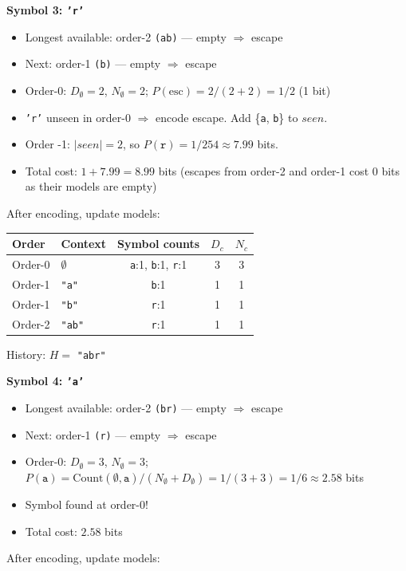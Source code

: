 \begin{examplebox}
\bigskip
\textbf{Symbol 3: \texttt{'r'}}
\begin{itemize}
    \item Longest available: order-2 \texttt{(ab)} — empty $\Rightarrow$ escape
    \item Next: order-1 \texttt{(b)} — empty $\Rightarrow$ escape
    \item Order-0: $D_{\emptyset}=2$, $N_{\emptyset}=2$; $P(\text{esc}) = 2/(2+2) = 1/2$ (1 bit)
    \item \texttt{'r'} unseen in order-0 $\Rightarrow$ encode escape. Add \{\texttt{a}, \texttt{b}\} to $seen$.
    \item Order -1: $|seen| = 2$, so $P(\texttt{r}) = 1/254 \approx 7.99$ bits.
    \item Total cost: $1 + 7.99 = 8.99$ bits (escapes from order-2 and order-1 cost 0 bits as their models are empty)
\end{itemize}
After encoding, update models:

\begin{center}
\footnotesize
\begin{tabular}{|l|l|c|c|c|}
\hline
\textbf{Order} & \textbf{Context} & \textbf{Symbol counts} & $D_c$ & $N_c$ \\
\hline
Order-0 & $\emptyset$ & \texttt{a}:1, \texttt{b}:1, \texttt{r}:1 & 3 & 3 \\
Order-1 & \texttt{"a"} & \texttt{b}:1 & 1 & 1 \\
Order-1 & \texttt{"b"} & \texttt{r}:1 & 1 & 1 \\
Order-2 & \texttt{"ab"} & \texttt{r}:1 & 1 & 1 \\
\hline
\end{tabular}
\end{center}
History: $H =$ \texttt{"abr"}

\bigskip
\textbf{Symbol 4: \texttt{'a'}}
\begin{itemize}
    \item Longest available: order-2 \texttt{(br)} — empty $\Rightarrow$ escape
    \item Next: order-1 \texttt{(r)} — empty $\Rightarrow$ escape
    \item Order-0: $D_{\emptyset}=3$, $N_{\emptyset}=3$; $P(\texttt{a}) = \text{Count}(\emptyset,\texttt{a})/(N_{\emptyset}+D_{\emptyset}) = 1/(3+3) = 1/6 \approx 2.58$ bits
    \item Symbol found at order-0!
    \item Total cost: $2.58$ bits
\end{itemize}
After encoding, update models:


\end{examplebox}
